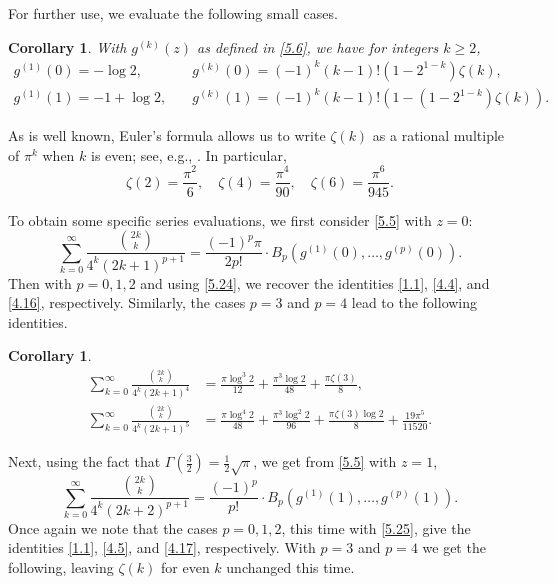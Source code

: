 \documentclass{amsart}
\newtheorem{corollary}[theorem]{Corollary}
\theoremstyle{definition}
\theoremstyle{remark}
\numberwithin{equation}{section}
\begin{document}
For further use, we evaluate the following small cases.

\begin{corollary}\label{cor:5.3}
With $g^{(k)}(z)$ as defined in \eqref{5.6}, we have for integers $k\geq 2$,
\begin{align}
g^{(1)}(0)=-\log{2},\quad
&g^{(k)}(0)=(-1)^k(k-1)!\left(1-2^{1-k}\right)\zeta(k),\label{5.24} \\
g^{(1)}(1)=-1+\log{2},\quad
&g^{(k)}(1)=(-1)^k(k-1)!\left(1-\left(1-2^{1-k}\right)\zeta(k)\right).\label{5.25}
\end{align}
\end{corollary}

As is well known, Euler's formula allows us to write $\zeta(k)$ as a rational
multiple of $\pi^k$ when $k$ is even; see, e.g., \cite[eq.~25.6.2]{DLMF}. In
particular,
\begin{equation}\label{5.26}
\zeta(2)=\frac{\pi^2}{6},\quad \zeta(4)=\frac{\pi^4}{90},\quad
\zeta(6)=\frac{\pi^6}{945}.
\end{equation}

To obtain some specific series evaluations, we first consider \eqref{5.5}
with $z=0$:
\begin{equation}\label{5.27}
\sum_{k=0}^\infty\frac{\binom{2k}{k}}{4^k(2k+1)^{p+1}}
=\frac{(-1)^p\pi}{2p!}\cdot B_{p}(g^{(1)}(0),\ldots,g^{(p)}(0)).
\end{equation}
Then with $p=0,1,2$ and using \eqref{5.24}, we recover the identities
\eqref{1.1}, \eqref{4.4}, and \eqref{4.16}, respectively. Similarly, the cases
$p=3$ and $p=4$ lead to the following identities.

\begin{corollary}\label{cor:5.4}
\begin{align}
\sum_{k=0}^\infty\frac{\binom{2k}{k}}{4^k(2k+1)^4}
&=\frac{\pi\log^3{2}}{12}+\frac{\pi^3\log{2}}{48}+\frac{\pi\zeta(3)}{8},\label{5.28}\\
\sum_{k=0}^\infty\frac{\binom{2k}{k}}{4^k(2k+1)^5}
&=\frac{\pi\log^4{2}}{48}+\frac{\pi^3\log^2{2}}{96}+\frac{\pi\zeta(3)\log{2}}{8}
+\frac{19\pi^5}{11520}.\label{5.29}
\end{align}
\end{corollary}

Next, using the fact that $\Gamma(\frac{3}{2})=\frac{1}{2}\sqrt{\pi}$, we get
from \eqref{5.5} with $z=1$,
\begin{equation}\label{5.30}
\sum_{k=0}^\infty\frac{\binom{2k}{k}}{4^k(2k+2)^{p+1}}
=\frac{(-1)^p}{p!}\cdot B_{p}(g^{(1)}(1),\ldots,g^{(p)}(1)).
\end{equation}
Once again we note that the cases $p=0,1,2$, this time with \eqref{5.25}, 
give the identities \eqref{1.1}, \eqref{4.5}, and \eqref{4.17}, respectively.
With $p=3$ and $p=4$ we get the following, leaving $\zeta(k)$ for even
$k$ unchanged this time.
\end{document}
